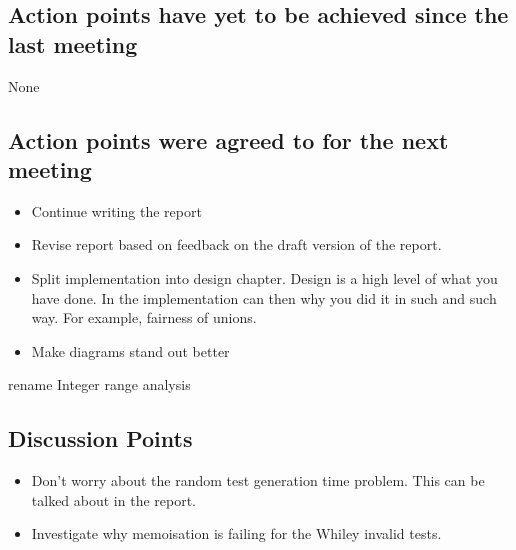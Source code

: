 \documentclass[]{article}
\begin{document}
\subsection{Action points have yet to be achieved since the last meeting}
None
\subsection{Action points were agreed to for the next meeting}
\begin{itemize}
	\item Continue writing the report 
	\item Revise report based on feedback on the draft version of the report.
	\item Split implementation into design chapter. Design is a high level of what you have done. In the implementation can then why you did it in such and such way. For example, fairness of unions.
	\item Make diagrams stand out better
\end{itemize}
rename Integer range analysis
\subsection{Discussion Points}
\begin{itemize}
	\item Don't worry about the random test generation time problem. This can be talked about in the report.
	\item Investigate why memoisation is failing for the Whiley invalid tests.
\end{itemize}
\end{document}
